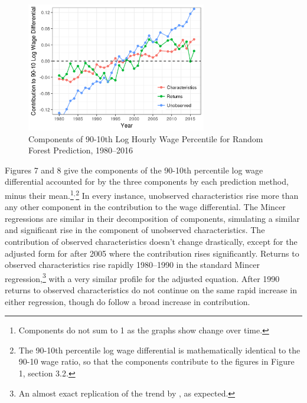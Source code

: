 \documentclass[notitlepage,12pt]{article}
\begin{document}
\begin{figure}[htb!]
  \centering
  \includegraphics[width=0.7\textwidth]{edit3.png}
  \caption{Components of 90-10th Log Hourly Wage Percentile for Random Forest Prediction, 1980--2016}
\end{figure}

Figures 7 and 8 give the components of the 90-10th percentile log wage differential accounted for by the three components by each prediction method, minus their mean.\footnote{Components do not sum to 1 as the graphs show change over time.}$^{,}$\footnote{The 90-10th percentile log wage differential is mathematically identical to the 90-10 wage ratio, so that the components contribute to the figures in Figure 1, section 3.2.}  In every instance, unobserved characteristics rise more than any other component in the contribution to the wage differential.  The Mincer regressions are similar in their decomposition of components, simulating a similar and significant rise in the component of unobserved characteristics.  The contribution of observed characteristics doesn't change drastically, except for the adjusted form for after 2005 where the contribution rises significantly.  Returns to observed characteristics rise rapidly 1980--1990 in the standard Mincer regression,\footnote{An almost exact replication of the trend by \cite{juhn1993wage}, as expected.} with a very similar profile for the adjusted equation.  After 1990 returns to observed characteristics do not continue on the same rapid increase in either regression, though do follow a broad increase in contribution.
\end{document}
